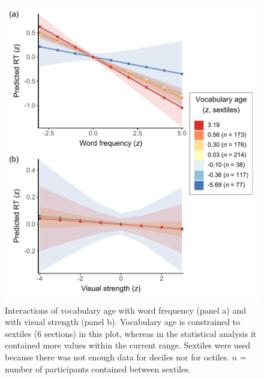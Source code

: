 \documentclass[
  12pt,
  man,floatsintext]{apa7}
\begin{document}
\begin{figure}

{\centering \includegraphics[width=0.8\linewidth]{../lexicaldecision/frequentist_analysis/plots/lexicaldecision-interactions-with-vocabulary-age} 

}

\caption{Interactions of vocabulary age with word frequency (panel a) and with visual strength (panel b). Vocabulary age is constrained to sextiles (6 sections) in this plot, whereas in the statistical analysis it contained more values within the current range. Sextiles were used because there was not enough data for deciles nor for octiles. \(n\) = number of participants contained between sextiles.}\label{fig:lexicaldecision-interactions-with-vocabulary-age}
\end{figure}
\end{document}
